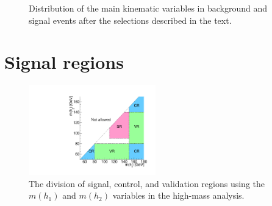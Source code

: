 \begin{figure}[htbp]
\caption{Distribution of  the main kinematic variables in background and signal events after the selections described in the text.}
\label{fig:ewk:sig:1}
\end{figure}

\FloatBarrier

\section{Signal regions}

\begin{figure}[htbp]
	\centering
	\includegraphics[width=0.490\textwidth]{figures/ewk_prod/varie/schema-1}
	\caption{The division of signal, control, and validation regions using the $m(h_1)$ and $m(h_2)$ variables in the high-mass analysis.}
	\label{fig:binning_crvr}
\end{figure}

